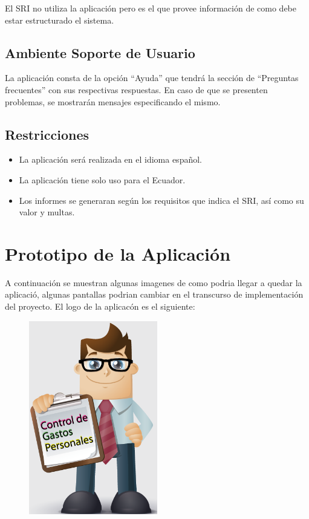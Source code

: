 \documentclass[a4paper,11pt]{article}
\begin{document}
El SRI no utiliza la aplicación pero es el que provee información de como debe estar estructurado el sistema.

   \subsection{ Ambiente Soporte de Usuario}
La aplicación consta de la opción “Ayuda” que tendrá la sección de “Preguntas frecuentes” con sus respectivas respuestas. En caso de que se presenten problemas, se mostrarán mensajes especificando el mismo.

    \subsection{ Restricciones}
\begin{itemize}
\item La aplicación será realizada en el idioma español.
\item La aplicación tiene solo uso para el Ecuador.
\item Los informes se generaran según los requisitos que indica el SRI, así como su valor y multas.
\end{itemize}

\section{ Prototipo de la Aplicación}
A continuación se muestran algunas imagenes de como podria llegar a quedar la aplicació, algunas pantallas podrian cambiar en el transcurso de implementación del proyecto.
El logo de la aplicacón es el siguiente:

\begin{figure} [h]
\begin {center}
\includegraphics[width=0.5\textwidth]{apli.png}
\end {center}
\end{figure}
\end{document}
